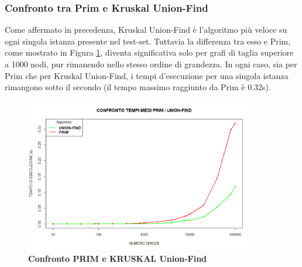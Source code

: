 \documentclass[]{article}
\begin{document}
\begin{flushleft}
\subsubsection{Confronto tra Prim e Kruskal Union-Find}
Come affermato in precedenza, Kruskal Union-Find è l'algoritmo più veloce su ogni singola istanza presente nel test-set. Tuttavia la differenza tra esso e Prim, come mostrato in Figura \ref{prim-uf}, diventa significativa solo per grafi di taglia superiore a 1000 nodi, pur rimanendo nello stesso ordine di grandezza. In ogni caso, sia per Prim che per Kruskal Union-Find, i tempi d'esecuzione per una singola istanza rimangono sotto il secondo (il tempo massimo raggiunto da Prim è 0.32s).
\begin{figure}[h]
\centering
\includegraphics[width=0.9\textwidth,height=\textheight,keepaspectratio]{COMPARE_1.png}
\caption{\textbf{Confronto PRIM e KRUSKAL Union-Find}}
\label{prim-uf}
\end{figure}

\end{flushleft}
\end{document}
